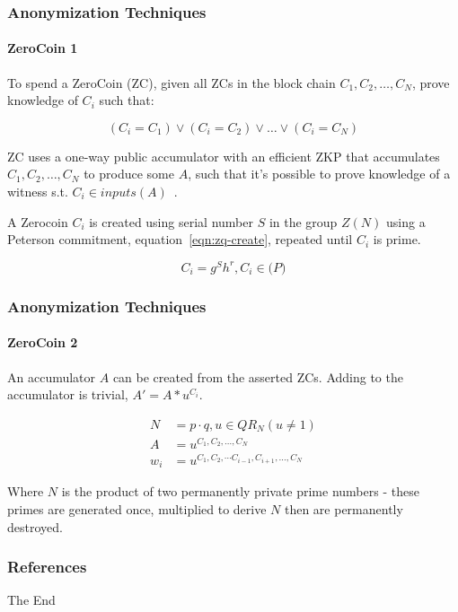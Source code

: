 \documentclass{beamer}
\begin{document}
\begin{frame}
\frametitle{Anonymization Techniques}
\framesubtitle{ZeroCoin 1}
To spend a ZeroCoin (ZC), given all ZCs in the block chain ${C_1, C_2,\dots,C_N}$, prove knowledge of $C_i$ such that:

\begin{equation}
    (C_i = C_1) \vee (C_i=C_2) \vee \dots \vee (C_i=C_N)
\end{equation}

ZC uses a one-way public accumulator with an efficient ZKP that accumulates ${C_1, C_2,\dots,C_N}$ to produce some $A$, such that it's possible to prove knowledge of a witness s.t. $C_i \in inputs(A)$~\cite{one-way-accumulators}.

A Zerocoin $C_{i}$ is created using serial number $S$ in the group $Z(N)$ using a Peterson commitment, equation~\ref{eqn:zq-create}, repeated until $C_i$ is prime.

\begin{equation}\label{eqn:zq-create}
C_{i}=g^Sh^r, C_i \in \mathbb(P)
\end{equation}
\end{frame}

\begin{frame}
\frametitle{Anonymization Techniques}
\framesubtitle{ZeroCoin 2}
An accumulator $A$ can be created from the asserted ZCs.  Adding to the accumulator is trivial, $A' = A*u^{C_i}$.

\begin{subequations}
    \begin{align}\label{eqn:zkp}
        N &= p \cdot q, u \in QR_{N}(u\neq1)\\
        A &= u^{C_1, C_2,\dots,C_N}\\
        w_i &=  u^{C_1, C_2,\cdots C_{i-1}, C_{i+1}, \dots ,C_N}
    \end{align}
\end{subequations}

Where $N$ is the product of two permanently private prime numbers - these primes are generated once, multiplied to derive $N$ then are permanently destroyed.

\end{frame}


\begin{frame}
\frametitle{References}
\footnotesize{
\printbibliography
}
\end{frame}
 
\begin{frame}
\centerline{The End}
\end{frame}
\end{document}
